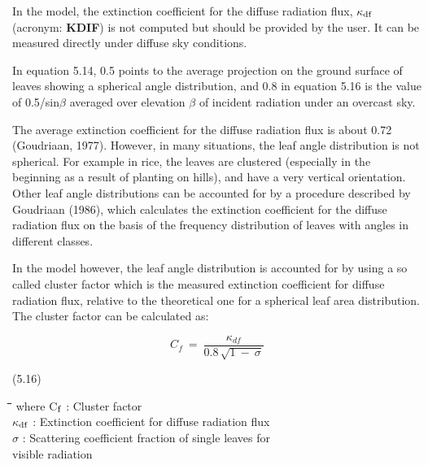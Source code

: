 \documentclass[11pt]{article}
\begin{document}
 \bigskip
In the model, the extinction coefficient for the diffuse radiation flux, {\bf $\kappa$$_{{\rm df}}$} (acronym: {\bf KDIF})
is not computed but should be provided by the user. It can be {\nobreak}measured directly under
diffuse sky conditions.

\bigskip
\bigskip
In equation 5.14, 0.5 points to the average projection on the ground surface of leaves
showing a spherical angle distribution, and 0.8 in equation 5.16 is the value of 0.5/sin$\beta$
averaged over elevation $\beta$ of incident radiation under an overcast sky.

\bigskip
\bigskip
\bigskip
\bigskip
\bigskip
\bigskip
\bigskip
The average extinction coefficient for the diffuse radiation flux is about 0.72 (Goudri\-aan,
1977). However, in many situations, the leaf angle distribution is not spherical. For
example in rice, the leaves are clustered (especially in the beginning as a result of
planting on hills), and have a very vertical orientation. Other leaf angle distributions can
be accounted for by a procedure described by Goudriaan (1986), which calculates the
extinction coefficient for the diffuse radiation flux on the basis of the frequency distribu\-tion of leaves with angles in different classes.

\bigskip
\bigskip
In the model however, the leaf angle distribution is accounted for by using a so called
cluster factor which is the measured extinction coefficient for diffuse radiation flux,
relative to the theoreti\-cal one for a spherical leaf area distribution. The cluster factor can
be calculated as: 

\begin{displaymath}
C _{f} ~=~{\frac{ \kappa _{df} }{0.8\, \sqrt{1 ~-~ \sigma } }}
\end{displaymath}

 \bigskip
\strut\hfill (5.16)

\nwln
\begin{tabbing}
\hspace{1.27cm}\=\hspace{1.27cm}\=\hspace{1.27cm}\=\hspace{1.27cm}\=%
\hspace{1.27cm}\=\hspace{1.27cm}\=\hspace{1.27cm}\=\hspace{1.27cm}\=%
\hspace{1.27cm}\=\hspace{1.27cm}\=\kill
where\> C$_{{\rm f}}$\> : Cluster factor\> \> \> \> \> \> \> \> [-]\\
\>$\kappa$$_{{\rm df}}$\> : Extinction coefficient for diffuse radiation flux\> \> \> \> \> \> \> \> [-]\\
\>$\sigma$\> : Scattering coefficient fraction of single leaves for\\
\>\>   visible radiation\> \> \> \> \> \> \> \> [-]
\end{tabbing}
\end{document}
